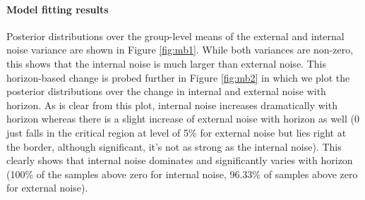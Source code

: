 \documentclass[12pt]{article}
\begin{document}
	
	
	
	
	
	\paragraph{Model fitting results} 
	
	
	Posterior distributions over the group-level means of the external and internal noise variance are shown in Figure \ref{fig:mb1}. While both variances are non-zero, this shows that the internal noise is much larger than external noise. This horizon-based change is probed further in Figure \ref{fig:mb2} in which we plot the posterior distributions over the change in internal and external noise with horizon. As is clear from this plot, internal noise increases dramatically with horizon whereas there is a slight increase of external noise with horizon as well (0 just falls in the critical region at level of 5\% for external noise but lies right at the border, although significant, it's not as strong as the internal noise). This clearly shows that internal noise dominates and significantly varies with horizon  (100\% of the samples above zero for internal noise, 96.33\% of samples above zero for external noise). 
	
	
\end{document}
